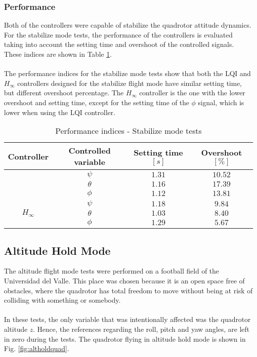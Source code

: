 \subsubsection{Performance}
Both of the controllers were capable of stabilize the quadrotor attitude dynamics. For the stabilize mode tests, the performance of the controllers is evaluated taking into account the setting time and overshoot of the controlled signals. These indices are shown in Table \ref{tb:stabilize_index}.
\\\\
The performance indices for the stabilize mode tests show that both the LQI and $H_\infty$ controllers designed for the stabilize flight mode have similar setting time, but different overshoot percentage. The $H_\infty$ controller is the one with the lower overshoot and setting time, except for the setting time of the $\phi$ signal, which is lower when using the LQI controller.
\begin{table}[H]
\small
\begin{center}
\caption{Performance indices - Stabilize mode tests}\label{tb:stabilize_index}
\begin{tabular}{c|c|c|c}\hline
\rule{0pt}{3ex} Controller & Controlled variable & Setting time $[s]$ & Overshoot $[\%]$ \\\hline\hline
\rule{0pt}{3ex} 
\multirow{3}{*}{LQI} 
 & $\psi$ & $1.31$ & $10.52$ \\
 & $\theta$ & $1.16$ & $17.39$ \\
 & $\phi$ & $1.12$ & $13.81$\\ \hline
\multirow{3}{*}{$H_\infty$} 
 & $\psi$ & $1.18$ & $9.84$ \\
 & $\theta$ & $1.03$ & $8.40$ \\
 & $\phi$ & $1.29$ & $5.67$ \\ \hline\hline
\end{tabular}
\end{center}
\end{table}
\subsection{Altitude Hold Mode}
The altitude flight mode tests were performed on a football field of the Universidad del Valle. This place was chosen because it is an open space free of obstacles, where the quadrotor has total freedom to move without being at risk of colliding with something or somebody.
\\\\
In these tests, the only variable that was intentionally affected was the quadrotor altitude $z$. Hence, the references regarding the roll, pitch and yaw angles, are left in zero during the tests. The quadrotor flying in altitude hold mode is shown in Fig. \ref{fig:altholdquad}.

